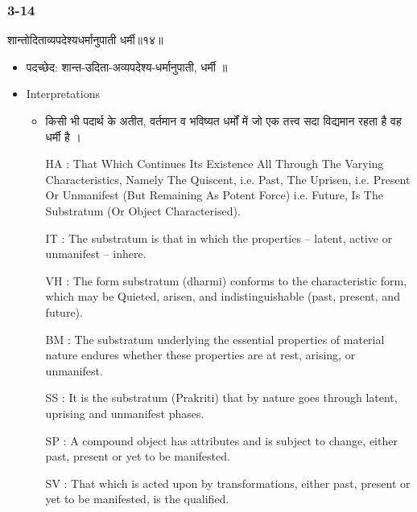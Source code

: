 \begin{frame}[fragile]\frametitle{3-14}
\begin{sanskrit}
शान्तोदिताव्यपदेश्यधर्मानुपाती धर्मी॥१४॥
\end{sanskrit}

	\begin{itemize}
	\item पदच्छेद:  शान्त-उदिता-अव्यपदेश्य-धर्मानुपाती, धर्मी ॥
	\item Interpretations
		\begin{itemize}	
		\item किसी भी पदार्थ के अतीत, वर्तमान व भविष्यत धर्मों में जो एक तत्त्व सदा विद्यमान रहता है वह धर्मी है ।
		\item [HA]: That Which Continues Its Existence All Through The Varying Characteristics, Namely The Quiscent, i.e. Past, The Uprisen, i.e. Present Or Unmanifest (But Remaining As Potent Force) i.e. Future, Is The Substratum (Or Object Characterised).
		\item [IT]: The substratum is that in which the properties – latent, active or unmanifest – inhere.
		\item [VH]: The form substratum (dharmi) conforms to the characteristic form, which may be Quieted, arisen, and indistinguishable (past, present, and future).
		\item [BM]: The substratum underlying the essential properties of material nature endures whether these properties are at rest, arising, or unmanifest.
		\item [SS]: It is the substratum (Prakriti) that by nature goes through latent, uprising and unmanifest phases.
		\item [SP]: A compound object has attributes and is subject to change, either past, present or yet to be manifested.
		\item [SV]: That which is acted upon by transformations, either past, present or yet to be manifested, is the qualified. 
		\end{itemize}
	\end{itemize}
\end{frame}

